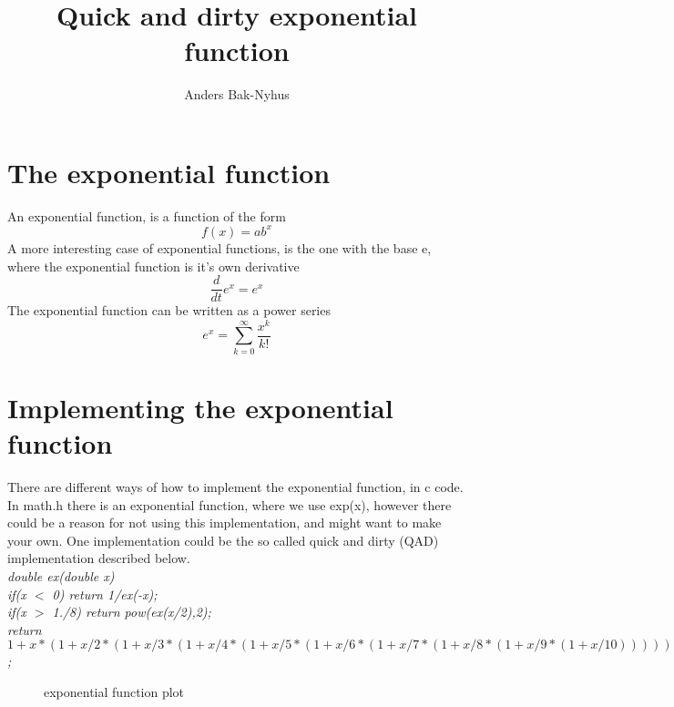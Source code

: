 \documentclass[]{article}
\title{Quick and dirty exponential function}
\author{Anders Bak-Nyhus}
\date{}
\begin{document}
\maketitle

\section*{The exponential function}
An exponential function, is a function of the form
\begin{equation}
	f(x) = ab^x
\end{equation}
A more interesting case of exponential functions, is the one with the base e, where the exponential function is it's own derivative
\begin{equation}
	\frac{d}{dt}e^x = e^x
\end{equation}
The exponential function can be written as a power series
\begin{equation}
	e^x = \sum_{k=0}^{\infty} \frac{x^k}{k!}
\end{equation}
\section*{Implementing the exponential function}
There are different ways of how to implement the exponential function, in c code. 
In math.h there is an exponential function, where we use exp(x), however there could be a reason for not using this implementation, and might want to make your own.
One implementation could be the so called quick and dirty (QAD) implementation described below.
\\
\textit{double ex(double x){\\
	if(x $<$ 0) return 1/ex(-x);\\
	if(x $>$ 1./8) return pow(ex(x/2),2);\\
	return $1+x*(1+x/2*(1+x/3*(1+x/4*(1+x/5*(1+x/6*(1+x/7*(1+x/8*(1+x/9*(1+x/10)))))))))$;
}
}
\\


\begin{figure}[h]
	
	\caption{exponential function plot}
	\label{fig:gpl}
\end{figure}
\end{document}
